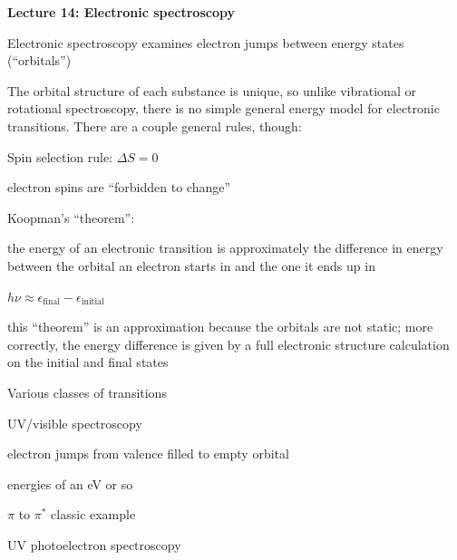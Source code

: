 \message{ !name(Outline.tex)}\documentclass[11pt]{article}
\begin{document}
\begin{outline}
\item {\bf Lecture 14: Electronic spectroscopy}
  \begin{outline}
  \item Electronic spectroscopy examines electron jumps between energy states (“orbitals”)
  \item The orbital structure of each substance is unique, so unlike vibrational or rotational spectroscopy, there is no simple general energy model for electronic transitions.  There are a couple general rules, though:
    \begin{outline}
      \item Spin selection rule: $\Delta S = 0$
        \begin{outline}
          \item electron spins are ``forbidden to change''
        \end{outline}
      \item Koopman’s ``theorem'':
        \begin{outline}
        \item the energy of an electronic transition is approximately the difference in energy between the orbital an electron starts in and the one it ends up in
          \begin{outline}
          \item $h \nu \approx \epsilon_\mathrm{final}-\epsilon_\mathrm{initial}$
          \end{outline}
        \item this “theorem” is an approximation because the orbitals are not static; more correctly, the energy difference is given by a full electronic structure calculation on the initial and final states
        \end{outline}
      \end{outline}
    \item Various classes of transitions
      \begin{outline}
      \item UV/visible spectroscopy
        \begin{outline}
        \item electron jumps from valence filled to empty orbital
        \item energies of an eV or so
        \item $\pi$ to $\pi^*$ classic example
        \end{outline}
      \item UV photoelectron spectroscopy
        \begin{outline}

\end{outline}
\end{outline}
\end{outline}
\end{outline}
\end{document}
